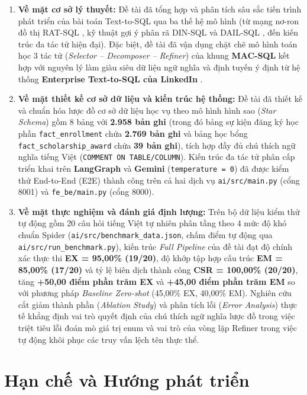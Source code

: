 \documentclass[12pt,a4paper]{report}
\begin{document}
\begin{enumerate}
    \item \textbf{Về mặt cơ sở lý thuyết:} Đề tài đã tổng hợp và phân tích sâu sắc tiến trình phát triển của bài toán Text-to-SQL qua ba thế hệ mô hình (từ mạng nơ-ron đồ thị RAT-SQL \cite{wang2020ratsql}, kỹ thuật gợi ý phân rã DIN-SQL \cite{pourreza2023dinsql} và DAIL-SQL \cite{gao2023dailsql}, đến kiến trúc đa tác tử hiện đại). Đặc biệt, đề tài đã vận dụng chặt chẽ mô hình toán học 3 tác tử (\textit{Selector -- Decomposer -- Refiner}) của khung \textbf{MAC-SQL} \cite{wang2025macsql} kết hợp với nguyên lý làm giàu siêu dữ liệu ngữ nghĩa và định tuyến ý định từ hệ thống \textbf{Enterprise Text-to-SQL của LinkedIn} \cite{chen2025enterprise}.
    \item \textbf{Về mặt thiết kế cơ sở dữ liệu và kiến trúc hệ thống:} Đề tài đã thiết kế và chuẩn hóa lược đồ cơ sở dữ liệu học vụ theo mô hình hình sao (\textit{Star Schema}) gồm 8 bảng với \textbf{2.958 bản ghi} (trong đó bảng sự kiện đăng ký học phần \texttt{fact\_enrollment} chứa \textbf{2.769 bản ghi} và bảng học bổng \texttt{fact\_scholarship\_award} chứa \textbf{39 bản ghi}), tích hợp đầy đủ chú thích ngữ nghĩa tiếng Việt (\texttt{COMMENT ON TABLE/COLUMN}). Kiến trúc đa tác tử phân cấp triển khai trên \textbf{LangGraph} và \textbf{Gemini} (\texttt{temperature = 0}) đã được kiểm thử End-to-End (E2E) thành công trên cả hai dịch vụ \texttt{ai/src/main.py} (cổng 8001) và \texttt{fe\_be/main.py} (cổng 8000).
    \item \textbf{Về mặt thực nghiệm và đánh giá định lượng:} Trên bộ dữ liệu kiểm thử tự động gồm 20 câu hỏi tiếng Việt tự nhiên phân tầng theo 4 mức độ khó chuẩn Spider (\texttt{ai/src/benchmark\_data.json}, chấm điểm tự động qua \texttt{ai/src/run\_benchmark.py}), kiến trúc \textit{Full Pipeline} của đề tài đạt độ chính xác thực thi \textbf{EX = 95,00\% (19/20)}, độ khớp tập hợp cấu trúc \textbf{EM = 85,00\% (17/20)} và tỷ lệ biên dịch thành công \textbf{CSR = 100,00\% (20/20)}, tăng \textbf{+50,00 điểm phần trăm EX} và \textbf{+45,00 điểm phần trăm EM} so với phương pháp \textit{Baseline Zero-shot} (45,00\% EX, 40,00\% EM). Nghiên cứu cắt giảm thành phần (\textit{Ablation Study}) và phân tích lỗi (\textit{Error Analysis}) thực tế khẳng định vai trò quyết định của chú thích ngữ nghĩa lược đồ trong việc triệt tiêu lỗi đoán mò giá trị enum và vai trò của vòng lặp Refiner trong việc tự động khôi phục các truy vấn lệch tên thực thể.
\end{enumerate}

\section{Hạn chế và Hướng phát triển}
\end{document}

